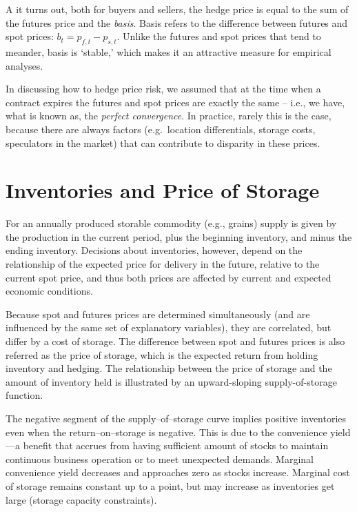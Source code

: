 \documentclass[
]{book}
\begin{document}
A it turns out, both for buyers and sellers, the hedge price is equal to the sum of the futures price and the \emph{basis}. Basis refers to the difference between futures and spot prices: \(b_{t} = p_{f,t}-p_{s,t}\). Unlike the futures and spot prices that tend to meander, basis is `stable,' which makes it an attractive measure for empirical analyses.

In discussing how to hedge price risk, we assumed that at the time when a contract expires the futures and spot prices are exactly the same -- i.e., we have, what is known as, the \emph{perfect convergence}. In practice, rarely this is the case, because there are always factors (e.g.~location differentials, storage costs, speculators in the market) that can contribute to disparity in these prices.

\hypertarget{inventories-and-price-of-storage}{%
\section{Inventories and Price of Storage}\label{inventories-and-price-of-storage}}

For an annually produced storable commodity (e.g., grains) supply is given by the production in the current period, plus the beginning inventory, and minus the ending inventory. Decisions about inventories, however, depend on the relationship of the expected price for delivery in the future, relative to the current spot price, and thus both prices are affected by current and expected economic conditions.

Because spot and futures prices are determined simultaneously (and are influenced by the same set of explanatory variables), they are correlated, but differ by a cost of storage. The difference between spot and futures prices is also referred as the price of storage, which is the expected return from holding inventory and hedging. The relationship between the price of storage and the amount of inventory held is illustrated by an upward-sloping supply-of-storage function.

The negative segment of the supply--of--storage curve implies positive inventories even when the return--on--storage is negative. This is due to the convenience yield---a benefit that accrues from having sufficient amount of stocks to maintain continuous business operation or to meet unexpected demands. Marginal convenience yield decreases and approaches zero as stocks increase. Marginal cost of storage remains constant up to a point, but may increase as inventories get large (storage capacity constraints).
\end{document}
